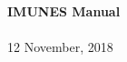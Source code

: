 \begin{titlepage}
\begin{mytitle}
\begin{center}

\HRule \\[0.7cm]
{\huge\bfseries IMUNES Manual}\\[0.4cm] 

\HRule \\[1.5cm]

{\Large 12 November, 2018}
 
\end{center}
\end{mytitle}
\end{titlepage}
